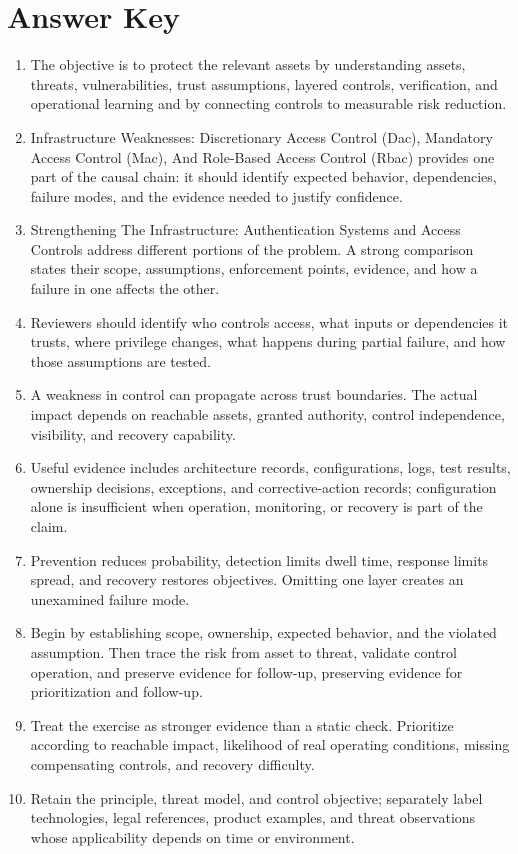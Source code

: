 \documentclass[11pt,letterpaper]{article}
\begin{document}
\section*{Answer Key}
\begin{enumerate}
\item The objective is to protect the relevant assets by understanding assets, threats, vulnerabilities, trust assumptions, layered controls, verification, and operational learning and by connecting controls to measurable risk reduction.
\item Infrastructure Weaknesses: Discretionary Access Control (Dac), Mandatory Access Control (Mac), And Role-Based Access Control (Rbac) provides one part of the causal chain: it should identify expected behavior, dependencies, failure modes, and the evidence needed to justify confidence.
\item Strengthening The Infrastructure: Authentication Systems and Access Controls address different portions of the problem. A strong comparison states their scope, assumptions, enforcement points, evidence, and how a failure in one affects the other.
\item Reviewers should identify who controls access, what inputs or dependencies it trusts, where privilege changes, what happens during partial failure, and how those assumptions are tested.
\item A weakness in control can propagate across trust boundaries. The actual impact depends on reachable assets, granted authority, control independence, visibility, and recovery capability.
\item Useful evidence includes architecture records, configurations, logs, test results, ownership decisions, exceptions, and corrective-action records; configuration alone is insufficient when operation, monitoring, or recovery is part of the claim.
\item Prevention reduces probability, detection limits dwell time, response limits spread, and recovery restores objectives. Omitting one layer creates an unexamined failure mode.
\item Begin by establishing scope, ownership, expected behavior, and the violated assumption. Then trace the risk from asset to threat, validate control operation, and preserve evidence for follow-up, preserving evidence for prioritization and follow-up.
\item Treat the exercise as stronger evidence than a static check. Prioritize according to reachable impact, likelihood of real operating conditions, missing compensating controls, and recovery difficulty.
\item Retain the principle, threat model, and control objective; separately label technologies, legal references, product examples, and threat observations whose applicability depends on time or environment.
\end{enumerate}
\end{document}
